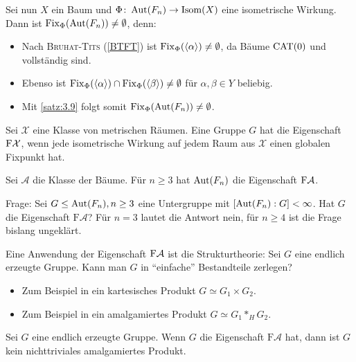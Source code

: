 \begin{no-bsp}
	Sei nun $X$ ein Baum und $\Phi\colon \operatorname{Aut}(F_n) \rightarrow \operatorname{Isom}(X)$ eine isometrische Wirkung.
	Dann ist $\operatorname{Fix}_\Phi(\operatorname{Aut}(F_n)) \neq \emptyset$, denn:
	\begin{itemize}
		\item Nach \textsc{Bruhat-Tits} (\autoref{BTFT}) ist $\operatorname{Fix}_\Phi(\langle\alpha\rangle) \neq \emptyset$, da Bäume $\operatorname{CAT(0)}$ und vollständig sind.
		\item Ebenso ist $\operatorname{Fix}_\Phi(\langle\alpha\rangle) \cap \operatorname{Fix}_\Phi(\langle\beta\rangle) \neq \emptyset$ für $\alpha, \beta \in Y$ beliebig.
		\item Mit \autoref{satz:3.9} folgt somit $\operatorname{Fix}_\Phi(\operatorname{Aut}(F_n)) \neq \emptyset$.
	\end{itemize}
\end{no-bsp}

\begin{definition}
\label{def:3.10}
	Sei  $\mathcal{X}$ eine Klasse von metrischen Räumen. 
	Eine Gruppe $G$ hat die Eigenschaft $\text{F}\mathcal{X}$, wenn jede isometrische Wirkung auf jedem Raum aus $\mathcal{X}$ einen globalen Fixpunkt hat.
\end{definition}

\begin{beispiel}
\label{bsp:3.11}
	Sei $\mathcal{A}$ die Klasse der Bäume.
	Für $n \geq 3$ hat $\operatorname{Aut}(F_n)$ die Eigenschaft $\text{F}\mathcal{A}$. 
\end{beispiel}

Frage:
Sei $G \leq \operatorname{Aut}(F_n), n \geq 3$ eine Untergruppe mit $[\operatorname{Aut}(F_n) : G] < \infty$.
Hat $G$ die Eigenschaft $\text{F}\mathcal{A}$?
Für $n = 3$ lautet die Antwort nein, für $n \geq 4$ ist die Frage bislang ungeklärt.

Eine Anwendung der Eigenschaft $\text{F}\mathcal{A}$ ist die Strukturtheorie:
Sei $G$ eine endlich erzeugte Gruppe.
Kann man $G$ in \enquote{einfache} Bestandteile zerlegen?
\begin{itemize}
	\item Zum Beispiel in ein kartesisches Produkt $G \simeq G_1 \times G_2$.
	\item Zum Beispiel in ein amalgamiertes Produkt $G \simeq G_1 *_H G_2$.
\end{itemize}

\begin{no-satz}
	Sei $G$ eine endlich erzeugte Gruppe.
	Wenn $G$ die Eigenschaft $\text{F}\mathcal{A}$ hat, dann ist $G$ kein nichttriviales amalgamiertes Produkt.
\end{no-satz}

